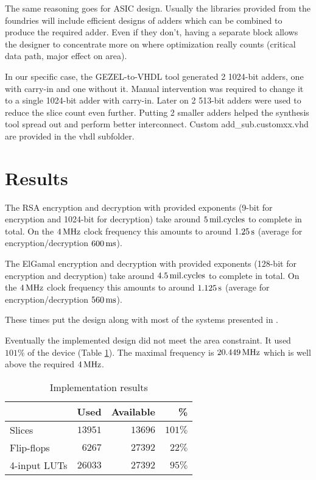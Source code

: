 The same reasoning goes for ASIC design. Usually the libraries
provided from the foundries will include efficient designs of adders
which can be combined to produce the required adder. Even if they
don't, having a separate block allows the designer to concentrate more
on where optimization really counts (critical data path, major effect
on area).

In our specific case, the GEZEL-to-VHDL tool generated 2 1024-bit
adders, one with carry-in and one without it. Manual intervention was
required to change it to a single 1024-bit adder with carry-in. Later
on 2 513-bit adders were used to reduce the slice count even further.
Putting 2 smaller adders helped the synthesis tool spread out and
perform better interconnect.
Custom add\_sub.customxx.vhd are provided in the vhdl subfolder.

\section{Results}

The RSA encryption and decryption with provided exponents (9-bit for encryption and 1024-bit for decryption) take around $\unit[5]{mil. cycles}$ to complete in total. On the $\unit[4]{MHz}$ clock frequency this amounts to around $\unit[1.25]{s}$ (average for encryption/decryption $\unit[600]{ms}$).

The ElGamal encryption and decryption with provided exponents (128-bit for encryption and decryption) take around $\unit[4.5]{mil. cycles}$ to complete in total. On the $\unit[4]{MHz}$ clock frequency this amounts to around $\unit[1.125]{s}$ (average for encryption/decryption $\unit[560]{ms}$).

These times put the design along with most of the systems presented in \cite{smartcard_crypto_coprocs, smartcard_crypto_coprocs2}.

Eventually the implemented design did not meet the area constraint. It
used $101\%$ of the device (Table \ref{tab:results}). The maximal
frequency is $\unit[20.449]{MHz}$ which is well above the required
$\unit[4]{MHz}$.

\begin{table}[hbt!]
  \centering
  \begin{tabular}[hbt!]{l|r|r|r}
                 & Used  & Available & \% \\
    \hline
    Slices       & $13951$ &     $13696$ & $101\%$ \\
    Flip-flops   &  $6267$ &     $27392$ &  $22\%$ \\
    4-input LUTs & $26033$ &     $27392$ &  $95\%$
  \end{tabular}
  \caption{Implementation results}
  \label{tab:results}
\end{table}

